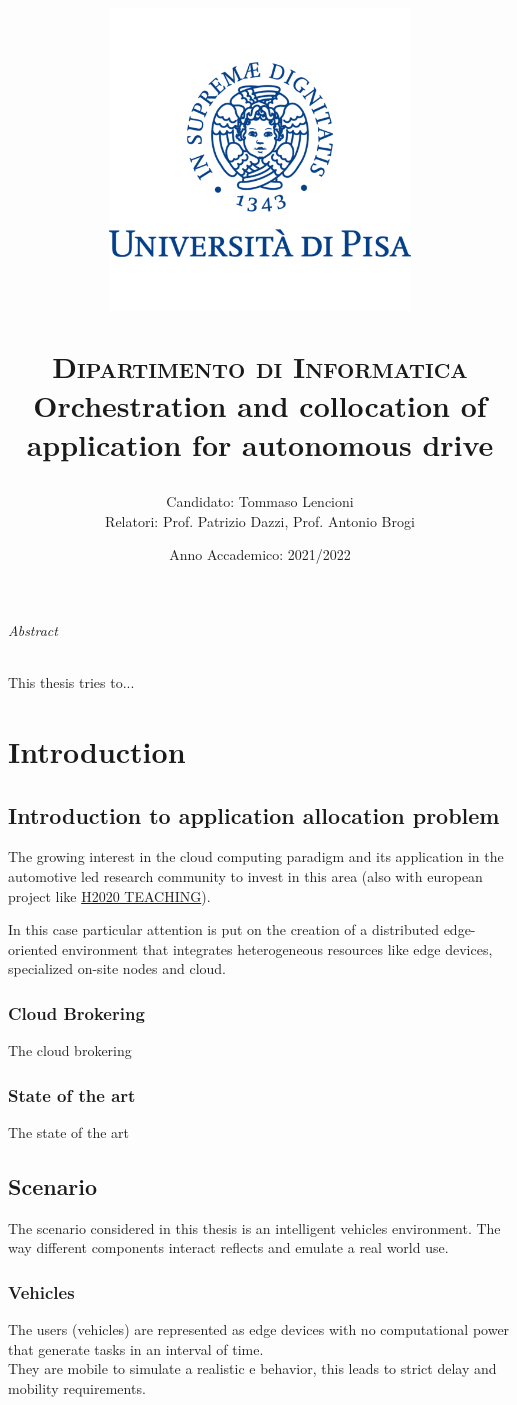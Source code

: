 \documentclass[12pt]{report}
\title{\centerline{\includegraphics[width=8cm,height=8cm]{logo.png}}
{\scshape Dipartimento di Informatica}\\
\vspace{0.5cm}
Orchestration and collocation of application for autonomous drive}
\author{Candidato: Tommaso Lencioni\\
Relatori: Prof. Patrizio Dazzi, Prof. Antonio Brogi}
\date{Anno Accademico: 2021/2022}
\begin{document}
\maketitle


\tableofcontents{}

\pagebreak

\paragraph*{Abstract}
This thesis tries to...


\part*{Introduction}
\chapter{Introduction to application allocation problem}
The growing interest in the cloud computing paradigm and its application in the automotive led research community to invest in this area (also with european project like \href{https://www.teaching-h2020.eu}{H2020 TEACHING}).

In this case particular attention is put on the creation of a distributed edge-oriented environment that integrates heterogeneous resources like edge devices, specialized on-site nodes and cloud.

\section{Cloud Brokering}
The cloud brokering
\section{State of the art}
The state of the art

\chapter{Scenario}
The scenario considered in this thesis is an intelligent vehicles environment. The way different components interact reflects and emulate a real world use.

\section{Vehicles}
The users (vehicles) are represented as edge devices with no computational power that generate tasks in an interval of time.\\
They are mobile to simulate a realistic e behavior, this leads to strict delay and mobility requirements.
\end{document}
